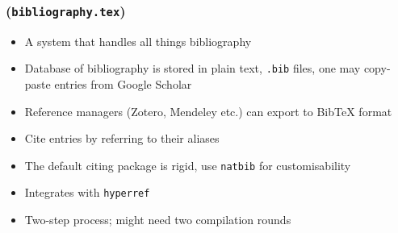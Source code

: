 \documentclass[xetex,colorlinks]{beamer} %
\begin{document}
  \subsubsection{}
  \begin{frame}
    \frametitle{ \\ (\texttt{bibliography.tex})}
    \begin{itemize}
     \item A system that handles all things bibliography
     \item Database of bibliography is stored in plain text, \texttt{.bib} files, one may copy-paste entries from Google Scholar
     \item Reference managers (Zotero, Mendeley etc.) can export to BibTeX format
     \item Cite entries by referring to their aliases
     \item The default citing package is rigid, use \texttt{natbib} for customisability
     \item Integrates with \texttt{hyperref}
     \item Two-step process; might need two compilation rounds
    \end{itemize}
  \end{frame}
  
\end{document}
